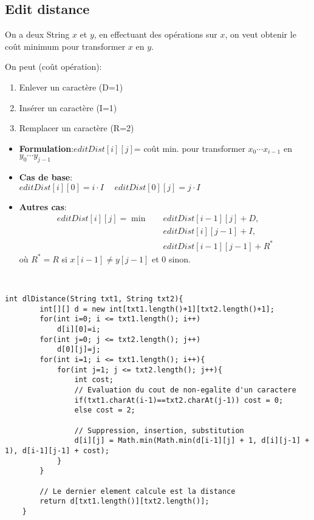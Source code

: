 \subsection{Edit distance}
On a deux String $x$ et $y$, en effectuant des opérations sur $x$, on veut obtenir le coût minimum pour transformer $x$ en $y$.

On peut (coût opération):
\begin{enumerate}
 \item Enlever un caractère (D=1)
 \item Insérer un caractère (I=1)
 \item Remplacer un caractère (R=2)
\end{enumerate}

\begin{itemize}
 \item \textbf{Formulation}:$
 editDist[i][j] $= coût min. pour transformer $x_0 \cdots x_{i - 1}$ en $y_0 \cdots y_{j - 1}$
 \item \textbf{Cas de base}: \\$ editDist[i][0] = i \cdot I \hspace{15pt}
 editDist[0][j] = j \cdot I$
 \item \textbf{Autres cas}:
 \begin{align*}
 editDist[i][j] = \min  \quad  & editDist[i - 1][j] + D, \\
                               & editDist[i][j - 1] + I, \\
                               & editDist[i - 1][j - 1] + R^*
 \end{align*}
 où $R^* = R$ si $x[i-1] \neq y[j-1]$ et $0$ sinon.
\end{itemize}
\ \newline
\begin{lstlisting}
int dlDistance(String txt1, String txt2){
        int[][] d = new int[txt1.length()+1][txt2.length()+1];
        for(int i=0; i <= txt1.length(); i++)
            d[i][0]=i;
        for(int j=0; j <= txt2.length(); j++)
            d[0][j]=j;
        for(int i=1; i <= txt1.length(); i++){
            for(int j=1; j <= txt2.length(); j++){
                int cost;
                // Evaluation du cout de non-egalite d'un caractere
                if(txt1.charAt(i-1)==txt2.charAt(j-1)) cost = 0;
                else cost = 2;
                
                // Suppression, insertion, substitution
                d[i][j] = Math.min(Math.min(d[i-1][j] + 1, d[i][j-1] + 1), d[i-1][j-1] + cost);
            }
        }
        
        // Le dernier element calcule est la distance
        return d[txt1.length()][txt2.length()];
    }
\end{lstlisting}